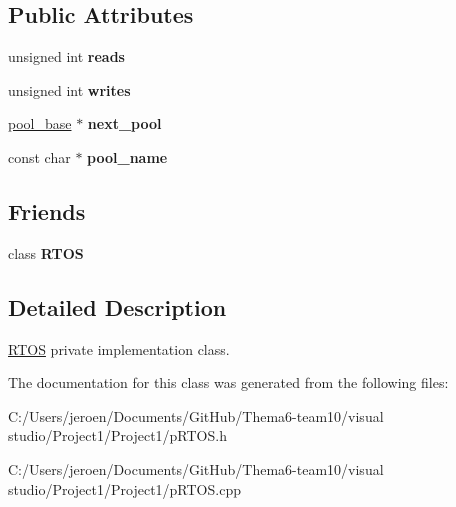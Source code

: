 \subsection*{Public Attributes}
\begin{DoxyCompactItemize}
\item 
unsigned int {\bfseries reads}\hypertarget{class_r_t_o_s_1_1pool__base_a37744d640ecc23f39e6693f4e00e761c}{}\label{class_r_t_o_s_1_1pool__base_a37744d640ecc23f39e6693f4e00e761c}

\item 
unsigned int {\bfseries writes}\hypertarget{class_r_t_o_s_1_1pool__base_ae4c15f975a7aab7889ae54f266f91c56}{}\label{class_r_t_o_s_1_1pool__base_ae4c15f975a7aab7889ae54f266f91c56}

\item 
\hyperlink{class_r_t_o_s_1_1pool__base}{pool\+\_\+base} $\ast$ {\bfseries next\+\_\+pool}\hypertarget{class_r_t_o_s_1_1pool__base_a8c13f0743810951752bf8791d06f03cd}{}\label{class_r_t_o_s_1_1pool__base_a8c13f0743810951752bf8791d06f03cd}

\item 
const char $\ast$ {\bfseries pool\+\_\+name}\hypertarget{class_r_t_o_s_1_1pool__base_a7aff133ec894002b944e7ec415dd658f}{}\label{class_r_t_o_s_1_1pool__base_a7aff133ec894002b944e7ec415dd658f}

\end{DoxyCompactItemize}
\subsection*{Friends}
\begin{DoxyCompactItemize}
\item 
class {\bfseries R\+T\+OS}\hypertarget{class_r_t_o_s_1_1pool__base_aa5b30b5b619f01a5d94b779bf0e58610}{}\label{class_r_t_o_s_1_1pool__base_aa5b30b5b619f01a5d94b779bf0e58610}

\end{DoxyCompactItemize}


\subsection{Detailed Description}
\hyperlink{class_r_t_o_s}{R\+T\+OS} private implementation class. 

The documentation for this class was generated from the following files\+:\begin{DoxyCompactItemize}
\item 
C\+:/\+Users/jeroen/\+Documents/\+Git\+Hub/\+Thema6-\/team10/visual studio/\+Project1/\+Project1/p\+R\+T\+O\+S.\+h\item 
C\+:/\+Users/jeroen/\+Documents/\+Git\+Hub/\+Thema6-\/team10/visual studio/\+Project1/\+Project1/p\+R\+T\+O\+S.\+cpp\end{DoxyCompactItemize}
